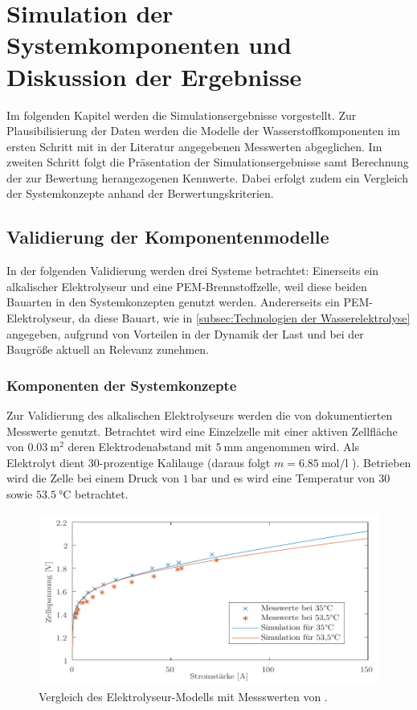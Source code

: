 \chapter{Simulation der Systemkomponenten und Diskussion der Ergebnisse}
\label{cha:Diskussion}
Im folgenden Kapitel werden die Simulationsergebnisse vorgestellt. Zur Plausibilisierung der Daten werden die Modelle der Wasserstoffkomponenten im ersten Schritt mit in der Literatur angegebenen Messwerten abgeglichen. Im zweiten Schritt folgt die Präsentation der Simulationsergebnisse samt Berechnung der zur Bewertung herangezogenen Kennwerte. Dabei erfolgt zudem ein Vergleich der Systemkonzepte anhand der Berwertungskriterien.
 
\section{Validierung der Komponentenmodelle}
\label{sec:Sektion 1}
In der folgenden Validierung werden drei Systeme betrachtet: Einerseits ein alkalischer Elektrolyseur und eine PEM-Brennstoffzelle, weil diese beiden Bauarten in den Systemkonzepten genutzt werden. Andererseits ein PEM-Elektrolyseur, da diese Bauart, wie in \ref{subsec:Technologien der Wasserelektrolyse} angegeben, aufgrund von Vorteilen in der Dynamik der Last und bei der Baugröße aktuell an Relevanz zunehmen. 

\subsection{Komponenten der Systemkonzepte}
Zur Validierung des alkalischen Elektrolyseurs werden die von \citet{hammoudi_new_2012} dokumentierten Messwerte genutzt. Betrachtet wird eine Einzelzelle mit einer aktiven Zellfläche von $\SI{0,03}{\m\squared}$ deren Elektrodenabstand mit $\SI{5}{\milli\m}$ angenommen wird. Als Elektrolyt dient $30$-prozentige Kalilauge (daraus folgt $m=\SI{6,85}{\mol\per\l}$ \citep{periodensystem-online_dichtewerttabelle_nodate}). Betrieben wird die Zelle bei einem Druck von $\SI{1}{\bar}$ und es wird eine Temperatur von $30$ sowie $\SI{53,5}{\degreeCelsius}$ betrachtet.

\begin{figure}[h]
	\centering
		\includegraphics[scale=1]{Figures/ValidierungALK}
		\caption{Vergleich des Elektrolyseur-Modells mit Messswerten von \citet{hammoudi_new_2012}.}
\label{fig:ValALK}	
\end{figure}

